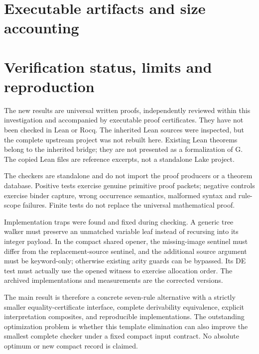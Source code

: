 \documentclass[11pt,letterpaper]{article}
\theoremstyle{definition}
\theoremstyle{remark}
\begin{document}
\section{Executable artifacts and size accounting}
\label{new:implementation}





\section{Verification status, limits and reproduction}
\label{new:verification}

The new results are universal written proofs, independently reviewed
within this investigation and accompanied by executable proof
certificates. They have not been checked in Lean or Rocq. The inherited
Lean sources were inspected, but the complete upstream project was not
rebuilt here. Existing Lean theorems belong to the inherited bridge;
they are not presented as a formalization of G. The copied Lean files
are reference excerpts, not a standalone Lake project.

The checkers are standalone and do not import the proof producers or a
theorem database. Positive tests exercise genuine primitive proof
packets; negative controls exercise binder capture, wrong occurrence
semantics, malformed syntax and rule-scope failures. Finite tests do not
replace the universal mathematical proof.

Implementation traps were found and fixed during checking.
A generic tree walker must preserve an unmatched variable leaf instead
of recursing into its integer payload. In the compact shared opener,
the missing-image sentinel must differ from the replacement-source
sentinel, and the additional source argument must be keyword-only;
otherwise existing arity guards can be bypassed. Its DE test must
actually use the opened witness to exercise allocation order. The
archived implementations and measurements are the corrected versions.

The main result is therefore a concrete seven-rule alternative with
a strictly smaller equality-certificate interface, complete derivability
equivalence, explicit interpretation composites, and reproducible
implementations. The outstanding optimization problem is whether this
template elimination can also improve the smallest complete checker
under a fixed compact input contract. No absolute optimum or new
compact record is claimed.
\end{document}
